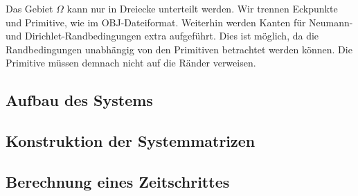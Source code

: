 \documentclass[crop=false,10pt,ngerman]{standalone}
\begin{document}
      Das Gebiet $\Omega$ kann nur in Dreiecke unterteilt werden.
      Wir trennen Eckpunkte und Primitive, wie im OBJ-Dateiformat.
      Weiterhin werden Kanten für Neumann- und Dirichlet-Randbedingungen extra aufgeführt.
      Dies ist möglich, da die Randbedingungen unabhängig von den Primitiven betrachtet werden können.
      Die Primitive müssen demnach nicht auf die Ränder verweisen.
      \cite{Alberty1998}

    \subsection{Aufbau des Systems} %
    \label{sub:aufbau_des_systems}


    \subsection{Konstruktion der Systemmatrizen} %
    \label{sub:konstruktion_der_mass_und_stiffness_matrix}




    \subsection{Berechnung eines Zeitschrittes} %
    \label{sub:konstruktion_des_linearen_gleichungssystems}


\end{document}
